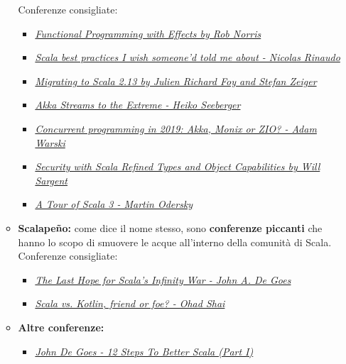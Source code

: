 \begin{itemize}
\begin{itemize}
		Conferenze consigliate:
		\begin{itemize}
			\item{\emph{\href{https://www.youtube.com/watch?v=30q6BkBv5MY}{Functional Programming with Effects by Rob Norris}}}
			\item{\emph{\href{https://www.youtube.com/watch?v=DGa58FfiMqc}{Scala best practices I wish someone'd told me about - Nicolas Rinaudo}}}
			\item{\emph{\href{https://www.youtube.com/watch?v=pHHKUKubs1Q&t=2002s}{Migrating to Scala 2.13 by Julien Richard Foy and Stefan Zeiger}}}
			\item{\emph{\href{https://www.youtube.com/watch?v=CrpJJYPzdJE&t=630s}{Akka Streams to the Extreme - Heiko Seeberger}}}
			\item{\emph{\href{https://www.youtube.com/watch?v=TqJg4AuxEIQ}{Concurrent programming in 2019: Akka, Monix or ZIO? - Adam Warski}}}
			\item{\emph{\href{https://www.youtube.com/watch?v=wfbF5jQiAhQ}{Security with Scala Refined Types and Object Capabilities by Will Sargent}}}
			\item{\emph{\href{https://www.youtube.com/watch?v=_Rnrx2lo9cw}{A Tour of Scala 3 - Martin Odersky}}}
		 \end{itemize} 
		\item{\textbf{Scalapeño:}} come dice il nome stesso, sono \textbf{conferenze piccanti} che hanno lo scopo di smuovere le acque all'interno della comunità di Scala.
		Conferenze consigliate:
		\begin{itemize}
			\item{\emph{\href{https://www.youtube.com/watch?v=v8IQ-X2HkGE}{The Last Hope for Scala's Infinity War - John A. De Goes}}}
			\item{\emph{\href{https://www.youtube.com/watch?v=Arwb6DSrWXE&t=102s}{Scala vs. Kotlin, friend or foe? - Ohad Shai}}}
		 \end{itemize}
		 \item{\textbf{Altre conferenze:}}
		 \begin{itemize}
		 	\item{\emph{\href{https://www.youtube.com/watch?v=71yhnTGw0hY&feature=youtu.be}{John De Goes - 12 Steps To Better Scala (Part I)}}}
		 \end{itemize}
	\end{itemize}
\end{itemize}
